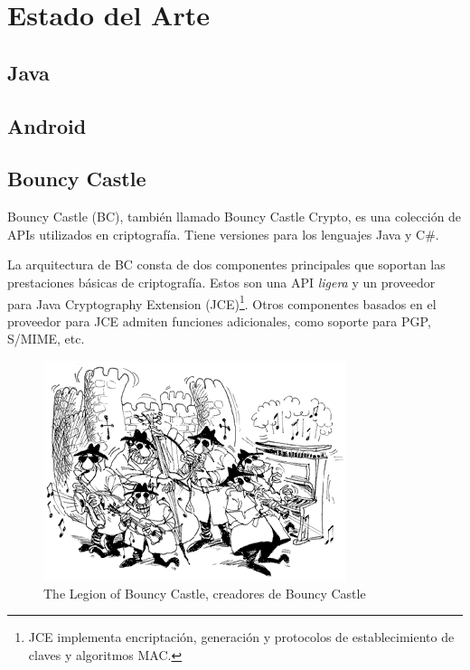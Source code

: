 
\chapter{Estado del Arte} %

\label{Chapter3} %


 \section{Java}


 \section{Android}


 \section{Bouncy Castle}

 Bouncy Castle (BC), también llamado Bouncy Castle Crypto, es una colección de APIs utilizados en criptografía. Tiene versiones para los lenguajes Java y C\#.

 La arquitectura de BC consta de dos componentes principales que soportan las prestaciones básicas de criptografía.
 Estos son una API \emph{ligera} y un proveedor para Java Cryptography Extension (JCE)\footnote{JCE implementa encriptación, generación y protocolos de establecimiento de claves y algoritmos MAC.}.
 Otros componentes basados en el proveedor para JCE admiten funciones adicionales, como soporte para PGP, S/MIME, etc. \emph{\parencite{Reference4}}

 \begin{figure}[ht]
   \centering
   \includegraphics{Figures/BouncyCastle}
   \decoRule
   \caption[Legion of Bouncy Castle]{The Legion of Bouncy Castle, creadores de Bouncy Castle}
   \label{fig:BouncyCastle}
 \end{figure}

